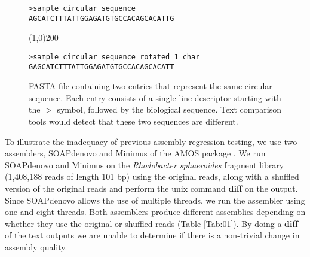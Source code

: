 \begin{figure}[!htb]%
\begin{center}
\begin{verbatim}
>sample circular sequence
AGCATCTTTATTGGAGATGTGCCACAGCACATTG
\end{verbatim}
\begin{center}
\line(1,0){200}
\end{center}
\begin{verbatim}
>sample circular sequence rotated 1 char
GAGCATCTTTATTGGAGATGTGCCACAGCACATT
\end{verbatim}
\end{center}
\renewcommand{\baselinestretch}{1}
\small\normalsize
\begin{quote}
\caption[FASTA file containing two entries that represent the same circular sequence.]{FASTA file containing two entries that represent the same circular sequence. Each entry consists of a single line descriptor starting with the $>$ symbol, followed by the biological sequence. Text comparison tools would detect that these two sequences are different.}
\label{fig:circular_genome}
\end{quote}
\end{figure}
\renewcommand{\baselinestretch}{2}
\small\normalsize

\iffalse
To illustrate the inadequacy of previous assembly regression testing, we use two assemblers, SOAPdenovo \cite{li2010novo} and Minimus of the AMOS package \cite{sommer2007minimus}.
We run SOAPdenovo and Minimus on the \emph{Rhodobacter sphaeroides} fragment library (1,408,188 reads of length 101 bp) using the original reads, along with a shuffled version of the original reads and perform the unix command \textbf{diff} on the output.
Since SOAPdenovo allows the use of multiple threads, we run the assembler using one and eight threads.
Both assemblers produce different assemblies depending on whether they use the original or shuffled reads (Table \ref{Tab:01}).
By doing a \textbf{diff} of the text outputs we are unable to determine if there is a non-trivial change in assembly quality.




